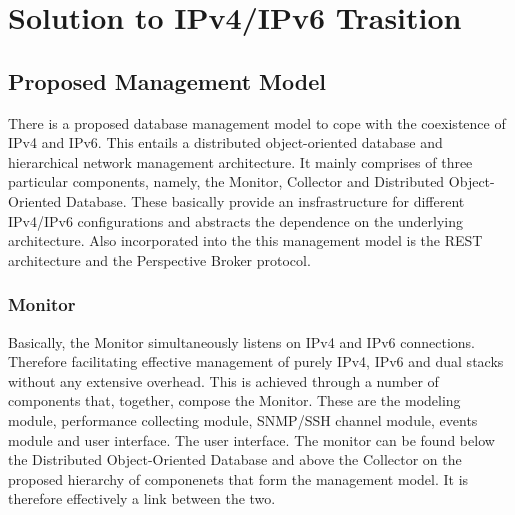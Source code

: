 
%
\section{Solution to IPv4/IPv6 Trasition}

\subsection{Proposed Management Model}
There is a proposed database management model to cope with the coexistence of IPv4 and IPv6. This entails a distributed object-oriented database and hierarchical network management architecture. It mainly comprises of three particular components, namely, the Monitor, Collector and Distributed Object-
Oriented Database. These basically provide an insfrastructure for different IPv4/IPv6 configurations and abstracts the dependence on the underlying architecture. Also incorporated into the this management model is the REST architecture and the Perspective Broker protocol. \cite{Zhao}

\subsubsection{Monitor}
Basically, the Monitor simultaneously listens on IPv4 and IPv6 connections. Therefore facilitating effective management of purely IPv4, IPv6 and dual stacks without any extensive overhead. This is achieved through a number of components that, together, compose the Monitor. These are the modeling module, performance
collecting module, SNMP/SSH channel module, events module and user interface. The user interface. The monitor can be found below the Distributed Object-Oriented Database and above the Collector on the proposed hierarchy of componenets that form the management model. It is therefore effectively a link between the two.
%